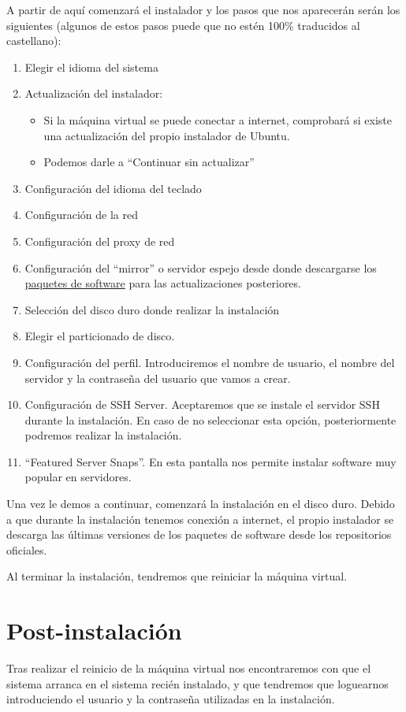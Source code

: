 A partir de aquí comenzará el instalador y los pasos que nos aparecerán serán los siguientes (algunos de estos pasos puede que no estén 100\% traducidos al castellano):

\begin{enumerate}
    \item Elegir el idioma del sistema
    \item Actualización del instalador:
    \begin{itemize}
        \item Si la máquina virtual se puede conectar a internet, comprobará si existe una actualización del propio instalador de Ubuntu.
        \item Podemos darle a “Continuar sin actualizar”
    \end{itemize}
    \item Configuración del idioma del teclado
    \item Configuración de la red
    \item Configuración del proxy de red
    \item Configuración del “mirror” o servidor espejo desde donde descargarse los \hyperlink{paquete_de_software}{paquetes de software} para las actualizaciones posteriores.
    \item Selección del disco duro donde realizar la instalación
    \item Elegir el particionado de disco.
    \item Configuración del perfil. Introduciremos el nombre de usuario, el nombre del servidor y la contraseña del usuario que vamos a crear.
    \item Configuración de SSH Server. Aceptaremos que se instale el servidor SSH durante la instalación. En caso de no seleccionar esta opción, posteriormente podremos realizar la instalación.
    \item “Featured Server Snaps”. En esta pantalla nos permite instalar software muy popular en servidores.
\end{enumerate}


Una vez le demos a continuar, comenzará la instalación en el disco duro. Debido a que durante la instalación tenemos conexión a internet, el propio instalador se descarga las últimas versiones de los paquetes de software desde los repositorios oficiales.


Al terminar la instalación, tendremos que reiniciar la máquina virtual.

\section{Post-instalación}
Tras realizar el reinicio de la máquina virtual nos encontraremos con que el sistema arranca en el sistema recién instalado, y que tendremos que loguearnos introduciendo el usuario y la contraseña utilizadas en la instalación.

